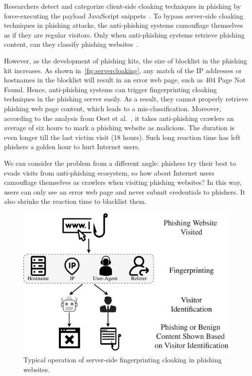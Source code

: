 Researchers detect and categorize client-side cloaking techniques in phishing by force-executing the payload JavaScript snippets~\cite{zhang2021crawlphish}.
To bypass server-side cloaking techniques in phishing attacks, the anti-phishing systems camouflage themselves as if they are regular visitors.
Only when anti-phishing systems retrieve phishing content, can they classify phishing websites~\cite{xiang2011cantina+,whittaker2010large,smartscreen}.

However, as the development of phishing kits, the size of blocklist in the phishing kit increases.
As shown in~\autoref{fig:servercloaking}, any match of the IP addresses or hostnames in the blocklist will result in an error web page, such as 404 Page Not Found.
Hence, anti-phishing systems can trigger fingerprinting cloaking techniques in the phishing server easily.
As a result, they cannot properly retrieve phishing web page content, which leads to a mis-classification.
Moreover, according to the analysis from Oest et al.~\cite{oest2020sunrise}, it takes anti-phishing crawlers an average of six hours to mark a phishing website as malicious.
The duration is even longer till the last victim visit (18 hours).
Such long reaction time has left phishers a golden hour to hurt Internet users.

We can consider the problem from a different angle: phishers try their best to evade visits from anti-phishing ecosystem, so how about Internet users camouflage themselves as crawlers when visiting phishing websites?
In this way, users can only see an error web page and never submit credentials to phishers.
It also shrinks the reaction time to blacklist them.




\begin{figure}
\centering
\includegraphics[width=.9\linewidth]{figs/fp_cloaking.pdf}
\caption{Typical operation of server-side fingerprinting cloaking in phishing websites.}
\label{fig:fp_cloaking}
\end{figure}